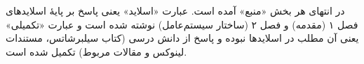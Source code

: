 \documentclass[11pt,a4paper]{article}
\begin{document}
\atlmaketitle

\begin{notebox}
در انتهای هر بخش «منبع» آمده است. عبارت «اسلاید» یعنی پاسخ بر پایهٔ اسلایدهای فصل ۱ (مقدمه) و فصل ۲ (ساختار سیستم‌عامل) نوشته شده است و عبارت «تکمیلی» یعنی آن مطلب در اسلایدها نبوده و پاسخ از دانش درسی (کتاب سیلبرشاتس، مستندات لینوکس و مقالات مربوط) تکمیل شده است.
\end{notebox}





\end{document}
